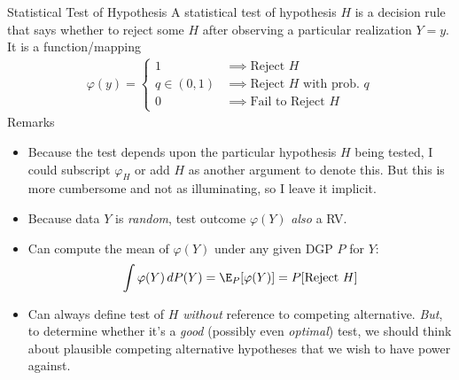 \documentclass[aspectratio=169, handout]{beamer}
\begin{document}
{\scriptsize
\begin{frame}{Statistical Test of Hypothesis}
A \alert{statistical test} of hypothesis $H$ is a decision rule that says
whether to reject some $H$ after observing a particular realization
$Y=y$.
It is a function/mapping
\begin{align}
  \varphi(y)
  =
  \begin{cases}
    1 & \implies \text{Reject $H$} \\
    q\in(0,1) & \implies \text{Reject $H$ with prob. $q$} \\
    0 & \implies \text{Fail to Reject $H$}
  \end{cases}
  \label{stattest}
\end{align}
\vspace{-10pt}
\pause
Remarks
\begin{itemize}
  \item Because the test depends upon the particular hypothesis $H$
    being tested, I could subscript $\varphi_H$ or add $H$ as another
    argument to denote this.
    But this is more cumbersome and not as illuminating, so I leave it
    implicit.

  \item
    Because data $Y$ is \emph{random}, test outcome $\varphi(Y)$
    \emph{also} a RV.

  \item Can compute the mean of $\varphi(Y)$ under any given DGP $P$ for
    $Y$:
    \begin{align*}
        \int \varphi(Y)\,dP(Y)
        =
        \E_P[\varphi(Y)]
        =
        P[\text{Reject $H$}]
    \end{align*}
  \pause
  \vspace{-10pt}

  \item Can always define test of $H$ \emph{without} reference to
    competing alternative.
    \emph{But}, to determine whether it's a \emph{good} (possibly even
    \emph{optimal}) test, we should think about plausible competing
    alternative hypotheses that we wish to have power against.

\end{itemize}
\end{frame}
}
\end{document}
